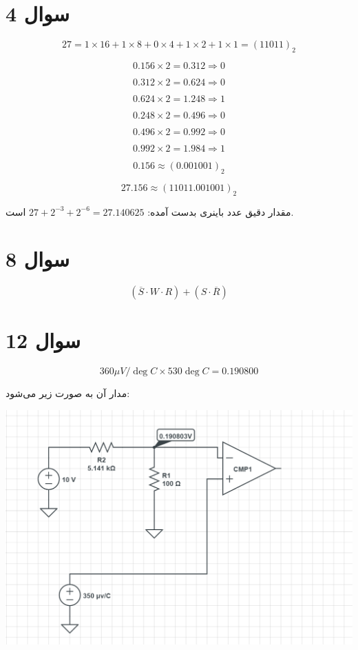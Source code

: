 \documentclass[12pt]{article}
\begin{document}
\KashidaOff


\section*{سوال 4}

$$27 = 1\times 16 + 1\times 8 + 0\times 4 + 1 \times 2 +1 \times 1 = (11011)_2$$

$$0.156 \times 2 = 0.312 \Rightarrow 0$$


$$0.312 \times 2 = 0.624 \Rightarrow 0$$


$$0.624 \times 2 = 1.248 \Rightarrow 1$$


$$0.248 \times 2 = 0.496 \Rightarrow 0$$


$$0.496 \times 2 = 0.992 \Rightarrow 0$$


$$0.992 \times 2 = 1.984 \Rightarrow 1$$


$$0.156 \approx (0.001001)_2$$

$$27.156 \approx (11011.001001)_2$$

مقدار دقیق عدد باینری بدست آمده:
$27 + 2^{-3} + 2^{-6} = 27.140625$
است.
\section*{سوال 8}

$$(\overline{S}\cdot W \cdot R) + (S \cdot \overline{R})$$
\newpage
\section*{سوال 12}


$$360 \mu V / \deg C \times 530 \deg C = 0.190800$$


مدار آن به صورت زیر می‌شود:

\begin{center}
	\includegraphics[width = 1.0 \textwidth]{images/1.png}
\end{center}
\end{document}
